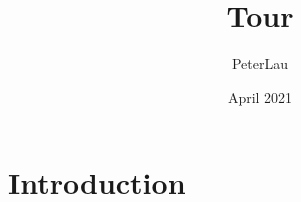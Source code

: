 \documentclass{article}
\title{Tour}
\author{PeterLau}
\date{April 2021}
\begin{document}
\maketitle

\section{Introduction}
\end{document}
